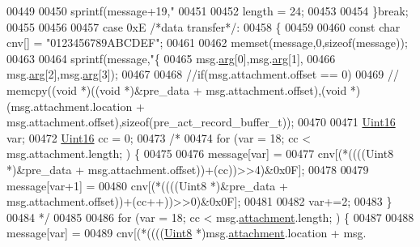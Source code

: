\begin{DoxyCode}
{{{00449 
00450        sprintf(message+19,\textcolor{stringliteral}{"%
00451 
00452        length = 24;
00453 
00454        \}\textcolor{keywordflow}{break};
00455 
00456 
00457        \textcolor{keywordflow}{case} 0xE \textcolor{comment}{/*data transfer*/}:
00458        \{
00459 
00460        \textcolor{keyword}{const} \textcolor{keywordtype}{char} cnv[] = \textcolor{stringliteral}{"0123456789ABCDEF"};
00461 
00462        memset(message,0,\textcolor{keyword}{sizeof}(message));
00463 
00464        sprintf(message,\textcolor{stringliteral}{"\{%
00465                                             msg.\hyperlink{a00031_af7d6f762438c80072bd9dc0e4dd4ae1e}{arg}[0],msg.\hyperlink{a00031_af7d6f762438c80072bd9dc0e4dd4ae1e}{arg}[1],
00466                                             msg.\hyperlink{a00031_af7d6f762438c80072bd9dc0e4dd4ae1e}{arg}[2],msg.\hyperlink{a00031_af7d6f762438c80072bd9dc0e4dd4ae1e}{arg}[3]);
00467 
00468        \textcolor{comment}{//if(msg.attachment.offset == 0)}
00469        \textcolor{comment}{//  memcpy((void *)((void *)&pre\_data + msg.attachment.offset),(void *)(msg.attachment.location +
       msg.attachment.offset),sizeof(pre\_act\_record\_buffer\_t));}
00470 
00471        \hyperlink{a00072_a59a9f6be4562c327cbfb4f7e8e18f08b}{Uint16} var;
00472        \hyperlink{a00072_a59a9f6be4562c327cbfb4f7e8e18f08b}{Uint16} cc = 0;
00473 \textcolor{comment}{/*}
00474 \textcolor{comment}{       for (var = 18; cc < msg.attachment.length; ) \{}
00475 \textcolor{comment}{}
00476 \textcolor{comment}{                   message[var]   =}
00477 \textcolor{comment}{                    cnv[(*((((Uint8 *)&pre\_data + msg.attachment.offset))+(cc))>>4)&0x0F];}
00478 \textcolor{comment}{}
00479 \textcolor{comment}{                   message[var+1]   =}
00480 \textcolor{comment}{                    cnv[(*((((Uint8 *)&pre\_data + msg.attachment.offset))+(cc++))>>0)&0x0F];}
00481 \textcolor{comment}{}
00482 \textcolor{comment}{                   var+=2;}
00483 \textcolor{comment}{       \}}
00484 \textcolor{comment}{*/}
00485    
00486        \textcolor{keywordflow}{for} (var = 18; cc < msg.\hyperlink{a00031_a040f6d5d58d18d8aeaf447eda7f50172}{attachment}.length; ) \{
00487 
00488                    message[var]   =
00489                     cnv[(*((((\hyperlink{a00072_af84840501dec18061d18a68c162a8fa2}{Uint8} *)msg.\hyperlink{a00031_a040f6d5d58d18d8aeaf447eda7f50172}{attachment}.location + msg.
}}}}}
\end{DoxyCode}
